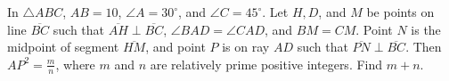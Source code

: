 In $\triangle ABC$,  $AB=10$,  $\angle A=30^\circ$,  and $\angle C=45^\circ$. Let $H,D$,  and $M$ be points on line $\overline{BC}$ such that $\overline{AH}\perp\overline{BC}$,  $\angle BAD=\angle CAD$,  and $BM=CM$. Point $N$ is the midpoint of segment $\overline{HM}$,  and point $P$ is on ray $AD$ such that $\overline{PN}\perp\overline{BC}$. Then $AP^2=\tfrac{m}{n}$,  where $m$ and $n$ are relatively prime positive integers. Find $m+n$.